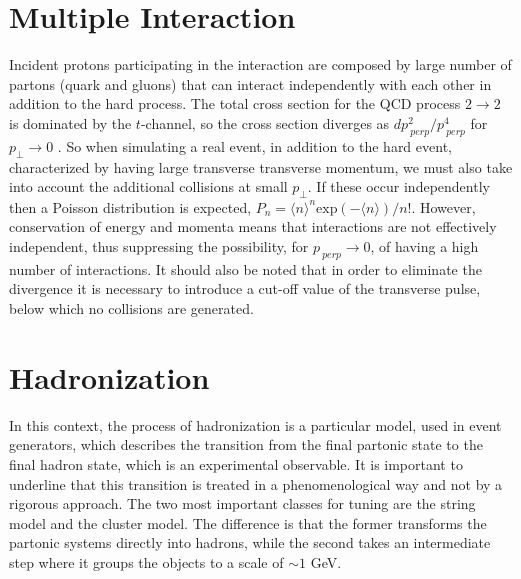 \section{Multiple Interaction}
Incident protons participating in the interaction are composed by  large number of partons (quark and gluons) that can interact independently with each other in addition to the hard process.
The total cross section for the QCD process $ 2 \rightarrow2 $ is dominated by the $t$-channel, so the cross section diverges as $ d p _ {\ perp} ^ 2 / p _ {\ perp} ^ 4 $ for $ p _ {\perp} \rightarrow 0 $ \cite{Sjostrand:2006su}.
So when simulating a real event, in addition to the hard event, characterized by having large transverse transverse momentum, we must also take into account the additional collisions at small $ p _{\perp} $. If these occur independently then a Poisson distribution is expected, $ P_n = \langle n \rangle ^ n \mbox {exp} (- \langle n \rangle) / n! $. However, conservation of energy and momenta means that interactions are not effectively independent, thus suppressing the possibility, for $ p_{\ perp} \rightarrow 0 $, of having a high number of interactions.
It should also be noted that in order to eliminate the divergence it is necessary to introduce a cut-off value of the transverse pulse, below which no collisions are generated.



\section{Hadronization }
In this context, the process of hadronization is a particular model, used in event generators, which describes the transition from the final partonic state to the final hadron state, which is an  experimental observable. It is important to underline that this transition is treated in a phenomenological way and not by a rigorous approach. The two most important classes for tuning are the string model and the cluster model. The difference is that the former transforms the partonic systems directly into hadrons, while the second takes an intermediate step where it groups the objects to a scale of $ \sim 1 $ GeV.

